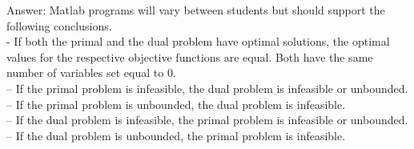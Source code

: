 \documentclass{article}
\begin{document}
\begin{enumerate}
Answer: Matlab programs will vary between students but should support the following conclusions.\\

- If both the primal and the dual problem have optimal solutions, the optimal values for the respective objective functions are equal. Both have the same number of variables set equal to 0.\\

– If the primal problem is infeasible, the dual problem is infeasible or unbounded. \\

– If the primal problem is unbounded, the dual problem is infeasible. \\

– If the dual problem is infeasible, the primal problem is infeasible or unbounded. \\

– If the dual problem is unbounded, the primal problem is infeasible. 


\end{enumerate}
\end{document}
